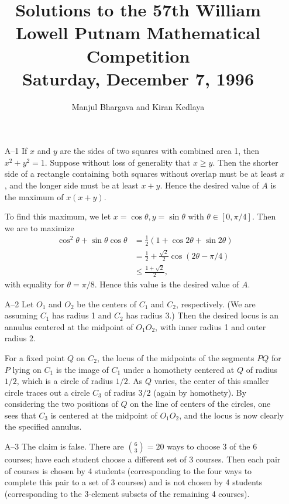 \documentclass[amssymb,twocolumn,pra,10pt,aps]{revtex4-1}
\begin{document}
\title{Solutions to the 57th William Lowell Putnam Mathematical Competition \\
    Saturday, December 7, 1996}
\author{Manjul Bhargava and Kiran Kedlaya}
\noaffiliation
\maketitle

\begin{itemize}
\item[A--1]
If $x$ and $y$ are the sides of two squares with combined area 1, then
$x^2 + y^2 = 1$. Suppose without loss of generality that $x \geq y$.
Then the shorter side of a rectangle containing both squares without
overlap must be at least $x$, and the longer side must be at least
$x+y$. Hence the desired value of $A$ is the maximum of $x(x+y)$.

To find this maximum, we let $x = \cos \theta, y = \sin \theta$ with
$\theta \in [0, \pi/4]$. Then we are to maximize
\begin{align*}
\cos^2 \theta + \sin \theta \cos \theta
&= \frac 12 (1 + \cos 2\theta + \sin 2\theta) \\
&= \frac 12 + \frac{\sqrt{2}}{2} \cos (2\theta - \pi/4) \\
&\leq \frac{1 + \sqrt{2}}{2},
\end{align*}
with equality for $\theta = \pi/8$. Hence this value is the desired
value of $A$.

\item[A--2]
Let $O_1$ and $O_2$ be the centers of $C_1$ and $C_2$, respectively.
(We are assuming $C_1$ has radius 1 and $C_2$ has radius 3.)
Then the
desired locus is an annulus centered at the midpoint of $O_1O_2$, with
inner radius 1 and outer radius 2.

For a fixed point $Q$ on $C_2$, the locus of the midpoints of the
segments $PQ$ for $P$ lying on $C_1$ is the image of $C_1$ under a
homothety centered at $Q$ of radius $1/2$, which is a circle of radius
$1/2$. As $Q$ varies, the center of this smaller circle traces out a
circle $C_3$ of radius $3/2$ (again by homothety). By considering the two
positions of $Q$ on the line of centers of the circles, one sees that
$C_3$ is centered at the midpoint of $O_1O_2$, and the locus is now
clearly the specified annulus.

\item[A--3]
The claim is false. There are $\binom{6}{3} = 20$ ways to choose 3 of the
6 courses; have each student choose a different set of 3 courses. Then
each pair of courses is chosen by 4 students (corresponding to the
four ways to complete this pair to a set of 3 courses) and is not
chosen by 4 students (corresponding to the 3-element subsets of the
remaining 4 courses).


\end{itemize}
\end{document}
